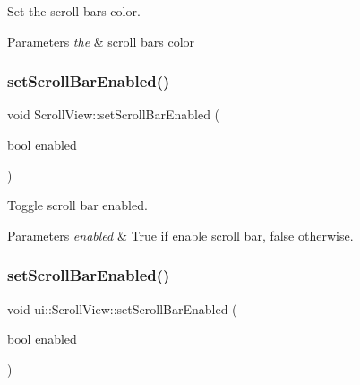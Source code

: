 Set the scroll bar\textquotesingle{}s color. 


\begin{DoxyParams}{Parameters}
{\em the} & scroll bar\textquotesingle{}s color \\
\hline
\end{DoxyParams}
\mbox{\label{classui_1_1ScrollView_a074e7a96ccc182b36068573b028af33e}} 
\subsubsection{\texorpdfstring{set\+Scroll\+Bar\+Enabled()}{setScrollBarEnabled()}\hspace{0.1cm}{\footnotesize\ttfamily [1/2]}}
{\footnotesize\ttfamily void Scroll\+View\+::set\+Scroll\+Bar\+Enabled (\begin{DoxyParamCaption}\item[{bool}]{enabled }\end{DoxyParamCaption})}



Toggle scroll bar enabled. 


\begin{DoxyParams}{Parameters}
{\em enabled} & True if enable scroll bar, false otherwise. \\
\hline
\end{DoxyParams}
\mbox{\label{classui_1_1ScrollView_a6c25c25ed2b48a56cd7937dbd173a2a7}} 
\subsubsection{\texorpdfstring{set\+Scroll\+Bar\+Enabled()}{setScrollBarEnabled()}\hspace{0.1cm}{\footnotesize\ttfamily [2/2]}}
{\footnotesize\ttfamily void ui\+::\+Scroll\+View\+::set\+Scroll\+Bar\+Enabled (\begin{DoxyParamCaption}\item[{bool}]{enabled }\end{DoxyParamCaption})}



